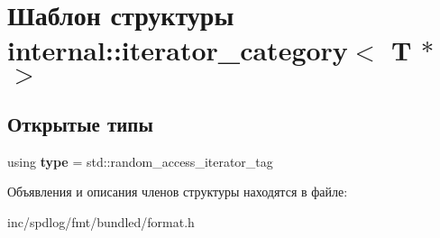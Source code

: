 \hypertarget{structinternal_1_1iterator__category_3_01T_01_5_01_4}{}\section{Шаблон структуры internal\+:\+:iterator\+\_\+category$<$ T $\ast$ $>$}
\label{structinternal_1_1iterator__category_3_01T_01_5_01_4}
\subsection*{Открытые типы}
\begin{DoxyCompactItemize}
\item 
\mbox{\label{structinternal_1_1iterator__category_3_01T_01_5_01_4_aca3bf9e0e5dae1ff50f76ff794d16ce6}} 
using {\bfseries type} = std\+::random\+\_\+access\+\_\+iterator\+\_\+tag
\end{DoxyCompactItemize}


Объявления и описания членов структуры находятся в файле\+:\begin{DoxyCompactItemize}
\item 
inc/spdlog/fmt/bundled/format.\+h\end{DoxyCompactItemize}
